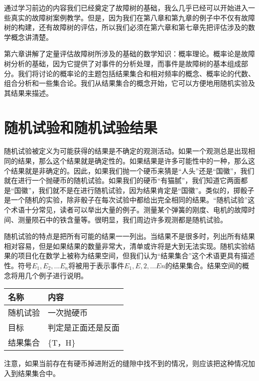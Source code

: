 \documentclass[cn,11pt,chinese]{elegantbook}
\begin{document}
 通过学习前边的内容我们已经奠定了故障树的基础，我么几乎已经可以开始进入一些真实的故障树案例教学。但是，因为我们在第八章和第九章的例子中不仅有故障树的构建，还有故障树的评估，所以我们必须在第六章和第七章先把评估涉及的数学概念讲清楚。
 
 第六章讲解了定量评估故障树所涉及的基础的数学知识：概率理论。概率论是故障树分析的基础，因为它提供了对事件的分析处理，而事件是故障树的基本组成部分。我们将讨论的概率论的主题包括结果集合和相对频率的概念、概率论的代数、组合分析和一些集合论。我们从结果集合的概念开始，它可以方便地用随机实验及其结果来描述。
 
 \section{随机试验和随机试验结果}

随机试验被定义为可能获得的结果是不确定的观测活动。如果一个观测总是出现相同的结果，那么这个结果就是确定性的。如果结果是许多可能性中的一种，那么这个结果就是非确定的。因此，如果我们抛一个硬币来猜是“人头”还是“国徽”，我们就在进行一个抛硬币的随机试验。如果我们的硬币“有猫腻”，我们知道它两面都是“国徽”，我们就不是在进行随机试验，因为结果肯定是“国徽”。类似的，掷骰子是一个随机的实验，除非骰子在每次试验中都给出完全相同的结果。“随机试验”这个术语十分常见，读者可以举出大量的例子。测量某个弹簧的刚度、电机的故障时间、测量陨石中的铁含量等。很明显，我们周边许多观测都是随机试验。

随机试验的特点是把所有可能的结果一一列出。当结果不是很多时，列出所有结果相对容易，但是如果结果的数量非常大，清单或许将是大到无法实现。随机实验结果的项目化在数学上被称为结果空间，但我们认为“结果集合”这个术语更具有描述性。符号${E_1,E_2,...E_n}$将被用于表示事件$E_1,E,2,...En$的结果集合。结果空间的概念将用几个例子进行说明。

\begin{table}[H]
	\centering
	\begin{tabular}{@{}ll@{}}
		\toprule
		名称   & 内容        \\ \midrule
		随机试验 & 一次抛硬币     \\
		目标   & 判定是正面还是反面 \\
		结果集合 & \{T，H\}   \\ \bottomrule
	\end{tabular}
\end{table}

注意，如果当前存在有硬币掉进附近的缝隙中找不到的情况，则应该把这种情况加入到结果集合中。
\end{document}
